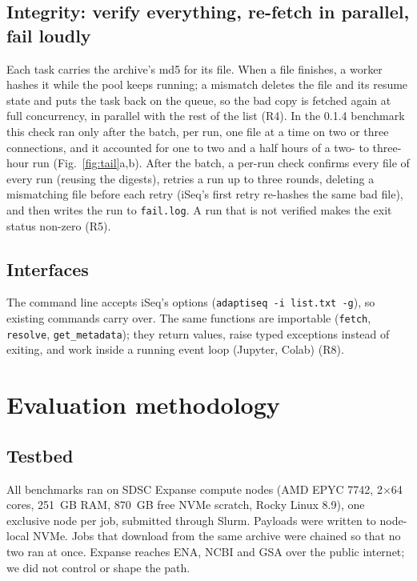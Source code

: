 \documentclass[11pt,a4paper]{article}
\newcommand{\code}[1]{\texttt{#1}}
\newcommand{\figref}[1]{Fig.~\ref{#1}}
\begin{document}
\subsection{Integrity: verify everything, re-fetch in parallel, fail loudly}
\label{sec:integrity}
Each task carries the archive's md5 for its file. When a file finishes, a worker hashes it while the pool keeps
running; a mismatch deletes the file and its resume state and puts the task back on the queue, so the bad copy is
fetched again at full concurrency, in parallel with the rest of the list (R4). In the 0.1.4 benchmark this check ran
only after the batch, per run, one file at a time on two or three connections, and it accounted for one to two and a half
hours of a two- to three-hour run (\figref{fig:tail}a,b). After the batch, a per-run check confirms every file of every
run (reusing the digests), retries a run up to three rounds, deleting a mismatching file before each retry (iSeq's first
retry re-hashes the same bad file), and then writes the run to \code{fail.log}. A run that is not verified makes the
exit status non-zero (R5).

\subsection{Interfaces}
\label{sec:api}
The command line accepts iSeq's options (\code{adaptiseq -i list.txt -g}), so existing commands carry over. The same
functions are importable (\code{fetch}, \code{resolve}, \code{get\_metadata}); they return values, raise typed
exceptions instead of exiting, and work inside a running event loop (Jupyter, Colab) (R8).

\section{Evaluation methodology}
\label{sec:method}

\subsection{Testbed}
All benchmarks ran on SDSC Expanse compute nodes (AMD EPYC 7742, 2$\times$64 cores, 251~GB RAM, 870~GB free NVMe
scratch, Rocky Linux 8.9), one exclusive node per job, submitted through Slurm. Payloads were written to node-local
NVMe. Jobs that download from the same archive were chained so that no two ran at once. Expanse reaches ENA, NCBI and
GSA over the public internet; we did not control or shape the path.
\end{document}
